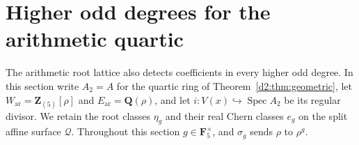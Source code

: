 \documentclass[11pt,a4paper]{amsart}
\numberwithin{equation}{section}
\theoremstyle{definition}
\theoremstyle{remark}
\begin{document}


\section{Higher odd degrees for the arithmetic quartic}
\label{d2ext:higher-odd-quartic}

The arithmetic root lattice also detects coefficients in every higher
odd degree. In this section write $A_2=A$ for the quartic ring of
Theorem~\ref{d2:thm:geometric}, let
$W_{\mathrm{ar}}=\mathbf Z_{(5)}[\rho]$ and
$E_{\mathrm{ar}}=\mathbf Q(\rho)$, and let
$i:V(x)\hookrightarrow\operatorname{Spec}A_2$ be its regular divisor.
We retain the root classes $\eta_g$ and their real Chern classes $e_g$
on the split affine surface $\mathcal Q$. Throughout this section
$g\in\mathbf F_5^\times$, and $\sigma_g$ sends $\rho$ to $\rho^g$.
\end{document}
